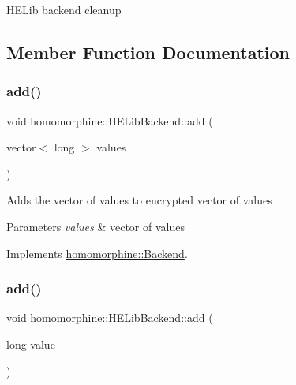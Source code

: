 H\+E\+Lib backend cleanup 

\subsection{Member Function Documentation}
\mbox{\label{classhomomorphine_1_1_h_e_lib_backend_a1e3c4745d7efdaac1f75c5a7fbfc3707}} 
\subsubsection{\texorpdfstring{add()}{add()}\hspace{0.1cm}{\footnotesize\ttfamily [1/2]}}
{\footnotesize\ttfamily void homomorphine\+::\+H\+E\+Lib\+Backend\+::add (\begin{DoxyParamCaption}\item[{vector$<$ long $>$}]{values }\end{DoxyParamCaption})\hspace{0.3cm}{\ttfamily [virtual]}}

Adds the vector of values to encrypted vector of values


\begin{DoxyParams}{Parameters}
{\em values} & vector of values \\
\hline
\end{DoxyParams}


Implements \mbox{\hyperlink{classhomomorphine_1_1_backend_ae381fb973ade6dd6a5caf8f6785e165e}{homomorphine\+::\+Backend}}.

\mbox{\label{classhomomorphine_1_1_h_e_lib_backend_a6cc00dcfc209206e67c7237934cb8d82}} 
\subsubsection{\texorpdfstring{add()}{add()}\hspace{0.1cm}{\footnotesize\ttfamily [2/2]}}
{\footnotesize\ttfamily void homomorphine\+::\+H\+E\+Lib\+Backend\+::add (\begin{DoxyParamCaption}\item[{long}]{value }\end{DoxyParamCaption})\hspace{0.3cm}{\ttfamily [virtual]}}


